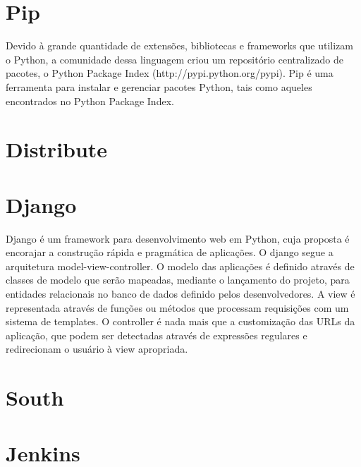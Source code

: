 \documentclass{abnt}
\begin{document}
	\section{Pip}
	
		Devido à grande quantidade de extensões, bibliotecas e frameworks que utilizam o Python, a comunidade dessa linguagem criou um repositório centralizado de pacotes, o Python Package Index (http://pypi.python.org/pypi).
		Pip é uma ferramenta para instalar e gerenciar pacotes Python, tais como aqueles encontrados no Python Package Index.\cite{PIPSITE}
	\section{Distribute}
	\section{Django}
		Django é um framework para desenvolvimento web em Python, cuja proposta
		é encorajar a construção rápida e pragmática de aplicações.\cite{DJANGOSITE}
		O django segue a arquitetura model-view-controller. O modelo das aplicações
		é definido através de classes de modelo que serão mapeadas, mediante o lançamento do projeto,
		para entidades relacionais no banco de dados definido pelos desenvolvedores. A view é
		representada através de funções ou métodos que processam requisições com um sistema
		de templates. O controller é nada mais que a customização das URLs da aplicação,
		que podem ser detectadas através de expressões regulares e redirecionam o
		usuário à view apropriada.\cite{DJANGOWIKIPEDIA}
	
	\section{South}
	\section{Jenkins}
			
\end{document}
